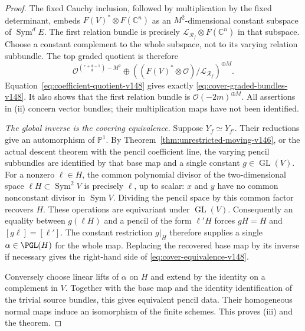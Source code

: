 \documentclass[11pt,reqno]{amsart}
\numberwithin{equation}{section}
\theoremstyle{definition}\newtheorem{definition}[theorem]{Definition}
\theoremstyle{remark}\newtheorem{remark}[theorem]{Remark}
\newcommand{\C}{\mathbb C}\newcommand{\Q}{\mathbb Q}
\newcommand{\Pj}{\mathbb P}\newcommand{\A}{\mathbb A}
\newcommand{\OO}{\mathcal O}\newcommand{\II}{\mathcal I}
\DeclareMathOperator{\Sym}{Sym}\DeclareMathOperator{\Gr}{Gr}
\begin{document}
\begin{proof}
The fixed Cauchy inclusion, followed by multiplication by the
fixed determinant, embeds
\(F(V)^*\otimes F(\C^n)\) as an \(M^2\)-dimensional
constant subspace of \(\Sym^d E\).
The first relation bundle is precisely
\(\mathcal L_{\mathcal R_f}\otimes F(\C^n)\) in that
subspace.  Choose a constant complement to the whole subspace,
not to its varying relation subbundle.  The top graded quotient is
therefore
\[
 \OO^{\binom{e+d-1}{d}-M^2}
 \oplus\left((F(V)^*\otimes\OO)/
                         \mathcal L_{\mathcal R_f}\right)^{\oplus M}.
\]
Equation~\eqref{eq:coefficient-quotient-v148} gives exactly
\eqref{eq:cover-graded-bundles-v148}.  It also shows that the
first relation bundle is \(\OO(-2m)^{\oplus M}\).
All assertions in (ii) concern vector bundles; their
multiplication maps have not been identified.

\emph{The global inverse is the covering equivalence.}
Suppose \(Y_f\simeq Y_{f'}\).  Their reductions give an
automorphism of \(\Pj^1\).  By
Theorem~\ref{thm:unrestricted-moving-v146}, or the actual
descent theorem with the pencil coefficient line, the varying
pencil subbundles are identified by that base map and a single
constant \(g\in\operatorname{GL}(V)\).
For a nonzero \(\ell\in H\), the common polynomial divisor
of the two-dimensional space \(\ell H\subset\Sym^2V\)
is precisely \(\ell\), up to scalar: \(x\) and \(y\)
have no common nonconstant divisor in \(\Sym V\).
Dividing the pencil space by this common factor recovers \(H\).
These operations are equivariant under \(\operatorname{GL}(V)\).
Consequently an equality between \(g(\ell H)\) and a pencil
of the form \(\ell'H\) forces \(gH=H\) and
\([g\ell]=[\ell']\).  The constant restriction \(g|_H\)
therefore supplies a single \(\alpha\in\PGL(H)\) for the
whole map.  Replacing the recovered base map by its inverse if
necessary gives the right-hand side of
\eqref{eq:cover-equivalence-v148}.

Conversely choose linear lifts of \(\alpha\) on \(H\) and
extend by the identity on a complement in \(V\).  Together with
the base map and the identity identification of the trivial source
bundles, this gives equivalent pencil data.  Their homogeneous
normal maps induce an isomorphism of the finite schemes.  This
proves (iii) and the theorem.
\end{proof}
\end{document}
